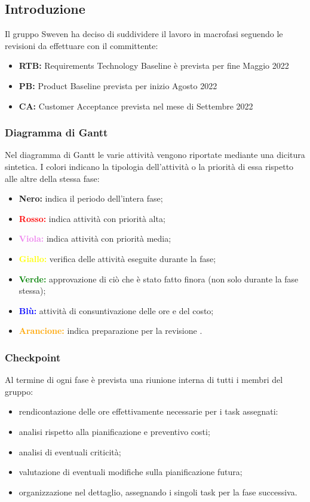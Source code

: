 \subsection{Introduzione}
Il gruppo Sweven ha deciso di suddividere il lavoro in macrofasi seguendo le revisioni da effettuare con il committente:
\begin{itemize}
    \item \textbf{RTB:} Requirements Technology Baseline è prevista per fine Maggio 2022
    \item \textbf{PB:} Product Baseline prevista per inizio Agosto 2022
    \item \textbf{CA:} Customer Acceptance prevista nel mese di Settembre 2022
\end{itemize}

\subsubsection{Diagramma di Gantt}
Nel diagramma di Gantt le varie attività vengono riportate mediante una dicitura sintetica. 
I colori indicano la tipologia dell'attività o la priorità di essa rispetto alle altre della stessa fase:
\begin{itemize}
    \item \textbf{Nero:} indica il periodo dell'intera fase;
    \item \textbf{\textcolor{red}{Rosso:}} indica attività con priorità alta;
    \item \textbf{\textcolor{violet}{Viola:}} indica attività con priorità media;
    \item \textbf{\textcolor{yellow}{Giallo:}} verifica delle attività eseguite durante la fase;
    \item \textbf{\textcolor{green}{Verde:}} approvazione di ciò che è stato fatto finora (non solo durante la fase stessa);
    \item \textbf{\textcolor{blue}{Blù:}} attività di consuntivazione delle ore e del costo;
    \item \textbf{\textcolor{orange}{Arancione:}} indica preparazione per la revisione .
\end{itemize}

\subsubsection{Checkpoint}
Al termine di ogni fase è prevista una riunione interna di tutti i membri del gruppo:
    \begin{itemize}
        \item rendicontazione delle ore effettivamente necessarie per i task assegnati:
        \item analisi rispetto alla pianificazione e preventivo costi;
        \item analisi di eventuali criticità;
        \item valutazione di eventuali modifiche sulla pianificazione futura;
        \item organizzazione nel dettaglio, assegnando i singoli task per la fase successiva. 
    \end{itemize}
